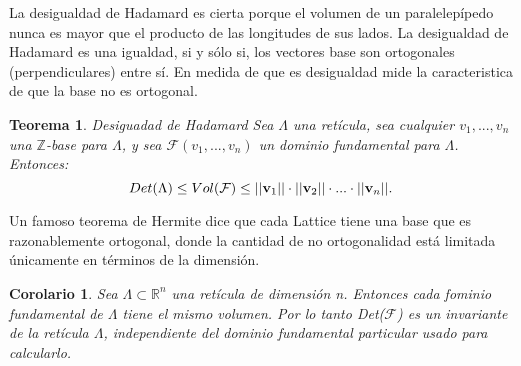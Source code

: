\documentclass[12pt]{report}
\newtheorem{teo}{Teorema}
\newtheorem{cor}{Corolario}
\begin{document}
La desigualdad de Hadamard es cierta porque el volumen de un paralelepípedo nunca es mayor que el producto de las longitudes de sus lados. La desigualdad de Hadamard es una igualdad, si y sólo si, los vectores base son ortogonales (perpendiculares) entre sí. En medida de que es desigualdad mide la caracteristica de que la base no es ortogonal.

\begin{teo}{Desiguadad de Hadamard} 
Sea $\Lambda$ una retícula, sea cualquier ${v}_{1}, ...,{v}_{n}$ una $\mathbb{Z}$-base para $\Lambda$, y sea $\mathcal{F}({v}_{1},...,{v}_{n})$ un dominio fundamental para $\Lambda$. Entonces: \\
\begin{equation}
\centering
Det(\Lambda) \leq Vol(\mathcal{F}) \leq ||\mathbf{v}_{1}|| \cdot ||\mathbf{v}_{2}|| \cdot ... \cdot ||\mathbf{v}_{n}||.
\end{equation}
\end{teo}

Un famoso teorema de Hermite dice que cada Lattice tiene una base que es razonablemente ortogonal, donde la cantidad de no ortogonalidad está limitada únicamente en términos de la dimensión.

\begin{cor}
Sea $\Lambda\subset{\mathbb{R}}^{n}$ una retícula de dimensión n. Entonces cada fominio fundamental de $\Lambda$ tiene el mismo volumen. Por lo tanto Det($\mathcal{F}$) es un invariante de la retícula $\Lambda$, independiente del dominio fundamental particular usado para calcularlo.
\end{cor}
\end{document}
